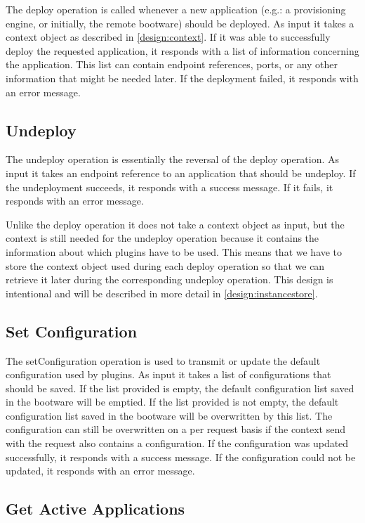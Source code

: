 The deploy operation is called whenever a new application (e.g.: a provisioning engine, or initially, the remote bootware) should be deployed.
As input it takes a context object as described in \autoref{design:context}.
If it was able to successfully deploy the requested application, it responds with a list of information concerning the application.
This list can contain endpoint references, ports, or any other information that might be needed later.
If the deployment failed, it responds with an error message.

\subsection{Undeploy}

The undeploy operation is essentially the reversal of the deploy operation.
As input it takes an endpoint reference to an application that should be undeploy.
If the undeployment succeeds, it responds with a success message.
If it fails, it responds with an error message.

Unlike the deploy operation it does not take a context object as input, but the context is still needed for the undeploy operation because it contains the information about which plugins have to be used.
This means that we have to store the context object used during each deploy operation so that we can retrieve it later during the corresponding undeploy operation.
This design is intentional and will be described in more detail in \autoref{design:instancestore}.

\subsection{Set Configuration}

The setConfiguration operation is used to transmit or update the default configuration used by plugins.
As input it takes a list of configurations that should be saved.
If the list provided is empty, the default configuration list saved in the bootware will be emptied.
If the list provided is not empty, the default configuration list saved in the bootware will be overwritten by this list.
The configuration can still be overwritten on a per request basis if the context send with the request also contains a configuration.
If the configuration was updated successfully, it responds with a success message.
If the configuration could not be updated, it responds with an error message.

\subsection{Get Active Applications}

